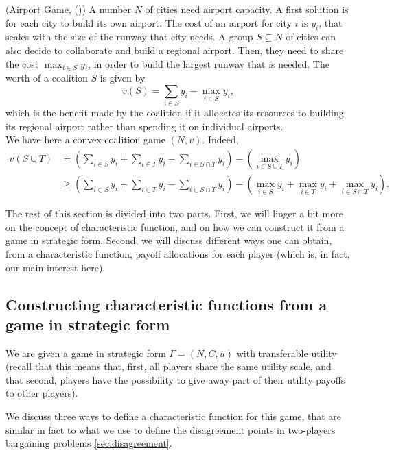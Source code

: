 \begin{example}(Airport Game,  (\cite{ShLeMSAG}))
A number $N$ of cities need airport capacity.
A first solution is for each city to build its own airport. The cost of an airport for city $i$ is $y_i$, that scales with the size of the runway that city needs.
A group $S \subseteq N$ of cities can also decide to collaborate and build a regional airport. Then, they need to share the cost $\max_{i \in S} y_i$, in order to build the largest runway that is needed.
The worth of a coalition $S$ is given by
$$ v(S) = \sum_{i \in S}y_i - \max_{i \in S} y_i, $$
which is the benefit made by the coalition if it allocates its resources to building its regional airport rather than spending it on individual airports.\\

We have here a convex coalition game $(N,v)$.
Indeed,
$$
\begin{aligned}
v(S \cup T) & =  \left (\sum_{i \in S} y_i + \sum_{i \in T} y_i - \sum_{i \in S \cap T} y_i \right) - \left ( \max_{i \in S \cup T } y_i \right ) \\
& \geq  \left (\sum_{i \in S} y_i + \sum_{i \in T} y_i - \sum_{i \in S \cap T} y_i \right ) - \left (  \max_{i \in S  } y_i + \max_{i \in T} y_i + \max_{i \in S \cap T} y_i \right ).
\end{aligned}
$$
\label{example:airport}
\end{example}



The rest of this section is divided into two parts. First, we will linger a bit more on the concept of characteristic function, and on how we can construct it from a game in strategic form. Second, we will discuss different ways one can obtain, from a characteristic function, payoff allocations for each player (which is, in fact, our main interest here).



\subsection{Constructing characteristic functions from a game in strategic form}

We are given a game in strategic form $\Gamma = (N, C, u)$ with transferable utility (recall that this means that, first, all players share the same utility scale, and that second, players have the possibility to give away part of their utility payoffs to other players).

We discuss three ways to define a characteristic function for this game, that are similar in fact to what we use to define the disagreement points in two-players bargaining problems \ref{sec:disagreement}.

